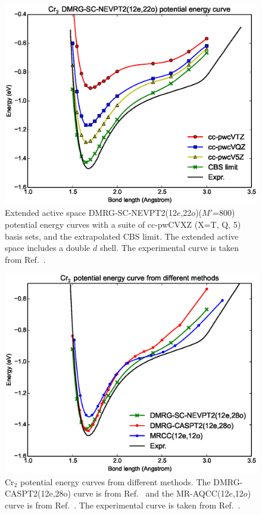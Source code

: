 \begin{figure}
  \centering
  \includegraphics[width=1.1\columnwidth]{Cr2-dmrg-nevpt2.eps}
  \caption{Extended active space DMRG-SC-NEVPT2(12$e$,22$o$)($M'$=800) potential energy curves with a suite of cc-pwCVXZ (X=T, Q, 5) basis sets,
    and the extrapolated CBS limit. The extended active space includes a double $d$ shell. 
The experimental curve is taken from Ref.~.}
  \label{fig:dmrg-nevpt2}
\end{figure}
\begin{figure}
  \includegraphics[width=1.5\columnwidth]{Cr2-curves.eps}
  \caption{Cr$_2$ potential energy curves from different methods.  The DMRG-CASPT2(12e,28o) curve is from Ref.~ and the MR-AQCC(12$e$,12$o$) curve is from Ref.~. The experimental curve is taken from Ref.~.
  }
  \label{fig:compare}
\end{figure}

